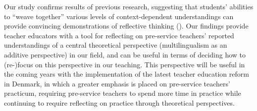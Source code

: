 \documentclass[output=paper]{langscibook}
\begin{document}
Our study confirms results of previous research, suggesting that students’ abilities to “weave together” various levels of context-dependent understandings can provide convincing demonstrations of reflective thinking (\citealt{Hood2016,Kirk2017,SzenesEtAl2015}). Our findings provide teacher educators with a tool for reflecting on pre-service teachers’ reported understandings of a central theoretical perspective (multilingualism as an additive perspective) in our field, and can be useful in terms of deciding how to (re-)focus on this perspective in our teaching. This perspective will be useful in the coming years with the implementation of the latest teacher education reform in Denmark, in which a greater emphasis is placed on pre-service teachers’ practicum, requiring pre-service teachers to spend more time in practice while continuing to require reflecting on practice through theoretical perspectives.

\printbibliography[heading=subbibliography,notkeyword=this]
\cleardoublepage
\end{document}
